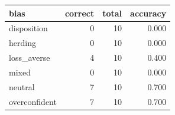 \begin{tabular}{lrrr}
\toprule
bias & correct & total & accuracy \\
\midrule
disposition & 0 & 10 & 0.000 \\
herding & 0 & 10 & 0.000 \\
loss_averse & 4 & 10 & 0.400 \\
mixed & 0 & 10 & 0.000 \\
neutral & 7 & 10 & 0.700 \\
overconfident & 7 & 10 & 0.700 \\
\bottomrule
\end{tabular}
